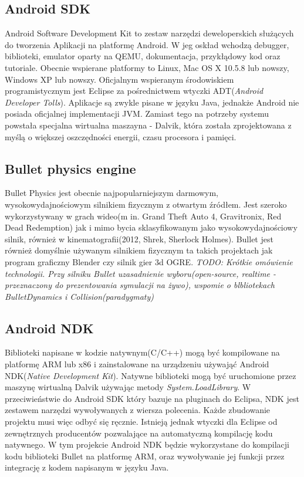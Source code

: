   \subsection{Android SDK}
Android Software Development Kit to zestaw narzędzi deweloperskich służących do
tworzenia Aplikacji na platformę Android. W jeg oskład wchodzą debugger,
biblioteki, emulator oparty na QEMU, dokumentacja, przykłądowy kod oraz
tutoriale. Obecnie wspierane platformy to Linux, Mac OS X 10.5.8 lub nowszy,
Windows XP lub nowszy. Oficjalnym wspieranym środowiskiem programistycznym jest
Eclipse za pośrednictwem wtyczki ADT(\emph{Android Developer Tolls}). Aplikacje
są zwykle pisane w języku Java, jednakże Android nie posiada oficjalnej
implementacji JVM. Zamiast tego na potrzeby systemu powstała specjalna
wirtualna maszayna - Dalvik, która została zprojektowana z myślą o większej
oszczędności energii, czasu procesora i pamięci.
  \subsection{Bullet physics engine}
Bullet Physics jest obecnie najpopularniejszym darmowym, wysokowydajnościowym
silnikiem fizycznym z otwartym źródłem. Jest szeroko wykorzystywany w grach
wideo(m in. Grand Theft Auto 4, Gravitronix, Red Dead Redemption) jak i
mimo bycia sklasyfikowanym jako wysokowydajnościowy silnik, również w
kinematografii(2012, Shrek, Sherlock Holmes). Bullet jest również domyślnie
używanym silnikiem fizycznym ta takich projektach jak program graficzny
Blender czy silnik gier 3d OGRE.
\emph{TODO: Krótkie omówienie technologii. Przy silniku Bullet
uzasadnienie wyboru(open-source, realtime - przeznaczony do prezentowania symulacji na
  żywo), wspomie o blbliotekach BulletDynamics i Collision(paradygmaty)}
\subsection{Android NDK}
Biblioteki napisane w kodzie natywnym(C/C++) mogą być kompilowane na platformę
ARM lub x86 i zainstalowane na urządzeniu używająć Android NDK(\emph{Native
Development Kit}). Natywne biblioteki mogą być uruchomione przez maszynę
wirtualną Dalvik używając metody \emph{System.LoadLibrary}. W przeciwieństwie do
Android SDK który bazuje na pluginach do Eclipsa, NDK jest zestawem narzędzi
wywoływanych z wiersza polecenia. Każde zbudowanie projektu musi więc odbyć się
ręcznie. Istnieją jednak wtyczki dla Eclipse od zewnętrznych producentów
pozwalające na automatyczną kompilację kodu natywnego. W tym projekcie Android
NDK będzie wykorzystane do kompilacji kodu biblioteki Bullet na platformę ARM,
oraz wywoływanie jej funkcji przez integrację z kodem napisanym w języku Java.
